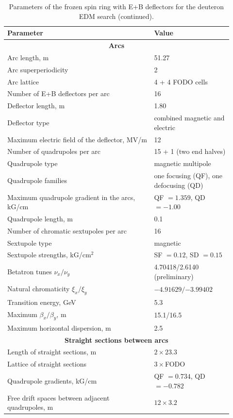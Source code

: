 \documentclass[%
  aps,
  pra,
  preprint,
  a4paper,
  amsmath,
  amssymb,
  floatfix,
  longbibliography,
  superscriptaddress
]{revtex4-2}
\begin{document}
\begin{table}[!htbp]
  \caption{Parameters of the frozen spin ring with E+B
    deflectors for the deuteron EDM search (continued).}
  \label{tab:dring-cont}
  \centering
  \renewcommand{\baselinestretch}{1}\small\selectfont
  \begin{tabular}{@{}p{0.60\linewidth}@{\hspace{1em}}p{0.32\linewidth}@{}}
    \toprule
    Parameter & Value \\
    \midrule
    \multicolumn{2}{c}{\textbf{Arcs}} \\
    \midrule
    Arc length, m & 51.27 \\
    Arc superperiodicity & 2 \\
    Arc lattice & 4 + 4 FODO cells \\
    Number of E+B deflectors per arc & 16 \\
    Deflector length, m & 1.80 \\
    Deflector type & combined magnetic and electric \\
    Maximum electric field of the deflector, MV/m & 12 \\
    Number of quadrupoles per arc & 15 + 1 (two end halves) \\
    Quadrupole type & magnetic multipole \\
    Quadrupole families & one focusing (QF), one defocusing (QD) \\
    Maximum quadrupole gradient in the arcs, kG/cm
      & QF $= 1.359$, QD $= -1.00$ \\
    Quadrupole length, m & 0.1 \\
    Number of chromatic sextupoles per arc & 16 \\
    Sextupole type & magnetic \\
    Sextupole strengths, kG/cm$^2$ & SF $= 0.12$, SD $= 0.15$ \\
    Betatron tunes $\nu_x/\nu_y$ & 4.70418/2.6140 (preliminary) \\
    Natural chromaticity $\xi_x/\xi_y$ & $-4.91629/{-3.99402}$ \\
    Transition energy, GeV & 5.3 \\
    Maximum $\beta_x/\beta_y$, m & 15.1/16.5 \\
    Maximum horizontal dispersion, m & 2.5 \\
    \midrule
    \multicolumn{2}{c}{\textbf{Straight sections between arcs}} \\
    \midrule
    Length of straight sections, m & $2\times 23.3$ \\
    Lattice of straight sections & $3\times$FODO \\
    Quadrupole gradients, kG/cm & QF $= 0.734$, QD $= -0.782$ \\
    Free drift spaces between adjacent quadrupoles, m & $12\times 3.2$ \\
    \bottomrule
  \end{tabular}
\end{table}
\end{document}

